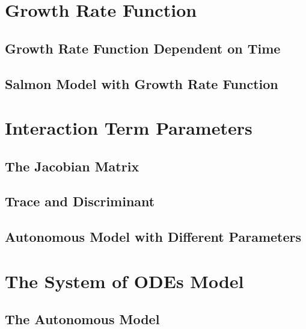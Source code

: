 \section{Growth Rate Function}

\subsection{Growth Rate Function Dependent on Time}



\subsection{Salmon Model with Growth Rate Function}



\section{Interaction Term Parameters}

\subsection{The Jacobian Matrix}



\subsection{Trace and Discriminant}



\subsection{Autonomous Model with Different Parameters}



\section{The System of ODEs Model}

\subsection{The Autonomous Model}

